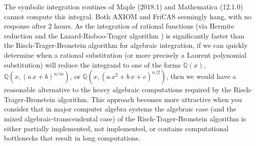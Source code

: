 \documentclass[12pt]{article}
\numberwithin{equation}{section}
\theoremstyle{definition}
\begin{document}
The symbolic integration routines of Maple (2018.1) and Mathematica (12.1.0) cannot compute this integral. Both 
AXIOM and FriCAS seemingly hang, with no response after 2 hours. As the integration of rational functions
(via Hermite reduction and the Lazard-Rioboo-Trager algorithm \cite{Bronstein1997}) is significantly faster than the 
Risch-Trager-Bronstein algorithm for algebraic integration, if we can quickly determine when a rational 
substitution (or more precisely a Laurent polynomial substitution) will reduce the integrand to one  
of the forms $\mathbb{Q}(x)$, $\mathbb{Q}(x, (a\,x+b)^{n/m})$, or $\mathbb{Q}(x,(a\,x^2+b\,x+c)^{n/2})$, 
then we would have a reasonable alternative to the heavy algebraic computations required by the 
Risch-Trager-Bronstein algorithm. This approach becomes more attractive when you consider that in major 
computer algebra systems the algebraic case (and the mixed algebraic-transcendental case) of the 
Risch-Trager-Bronstein algorithm is either partially implemented, not implemented, or contains computational 
bottlenecks that result in long computations. \\

\iffalse
Moses implemented domain-specific heuristics for certain classes of integrals. These 
included $$\int R(x) \exp(p(x)) dx,$$ where $R(x)$ is a rational function of $x$ and $p(x)$ 
is a polynomial in $x$ \cite[pp. 85]{Moses1967}. Shortly after, these methods were 
phased-out with the work of Risch. However in most CAS the algebraic case of the Risch 
algorithm is either partially implemented, not implemented, or contains computational 
bottlenecks that result in long computations. So for algebraic functions a domain-specific 
approach still has merit. 
\fi

\iffalse
\end{document}
